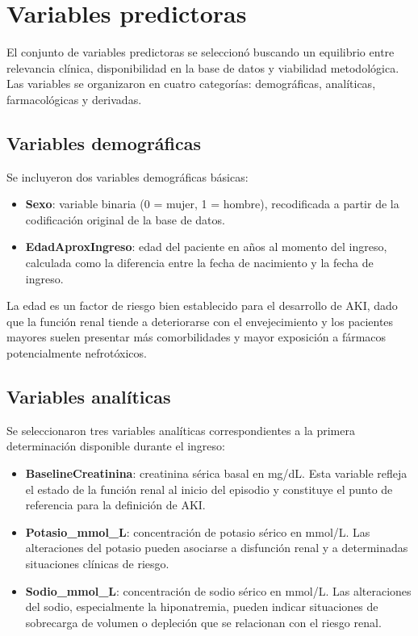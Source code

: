 \documentclass[12pt, a4paper, oneside]{report}
\begin{document}
\section{Variables predictoras}

El conjunto de variables predictoras se seleccionó buscando un equilibrio entre relevancia clínica, disponibilidad en la base de datos y viabilidad metodológica. Las variables se organizaron en cuatro categorías: demográficas, analíticas, farmacológicas y derivadas.

\subsection{Variables demográficas}

Se incluyeron dos variables demográficas básicas:

\begin{itemize}
    \item \textbf{Sexo}: variable binaria (0 = mujer, 1 = hombre), recodificada a partir de la codificación original de la base de datos.
    \item \textbf{EdadAproxIngreso}: edad del paciente en años al momento del ingreso, calculada como la diferencia entre la fecha de nacimiento y la fecha de ingreso.
\end{itemize}

La edad es un factor de riesgo bien establecido para el desarrollo de AKI, dado que la función renal tiende a deteriorarse con el envejecimiento y los pacientes mayores suelen presentar más comorbilidades y mayor exposición a fármacos potencialmente nefrotóxicos.

\subsection{Variables analíticas}

Se seleccionaron tres variables analíticas correspondientes a la primera determinación disponible durante el ingreso:

\begin{itemize}
    \item \textbf{BaselineCreatinina}: creatinina sérica basal en mg/dL. Esta variable refleja el estado de la función renal al inicio del episodio y constituye el punto de referencia para la definición de AKI.
    \item \textbf{Potasio\_mmol\_L}: concentración de potasio sérico en mmol/L. Las alteraciones del potasio pueden asociarse a disfunción renal y a determinadas situaciones clínicas de riesgo.
    \item \textbf{Sodio\_mmol\_L}: concentración de sodio sérico en mmol/L. Las alteraciones del sodio, especialmente la hiponatremia, pueden indicar situaciones de sobrecarga de volumen o depleción que se relacionan con el riesgo renal.
\end{itemize}
\end{document}
